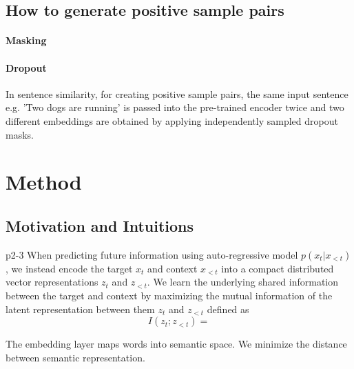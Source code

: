 \documentclass[a4paper]{article}
\begin{document}
	

	\subsection{How to generate positive sample pairs}
	\paragraph*{Masking}
	\paragraph*{Dropout} \cite{gao2021simcse} In sentence similarity, for creating positive sample pairs, the same input sentence e.g. 'Two dogs are running' is passed into the pre-trained encoder twice and two different embeddings are obtained by applying independently sampled dropout masks.  

	\section{Method}

	\subsection{Motivation and Intuitions}

	\cite{van2018representation}p2-3
	When predicting future information using auto-regressive model $p(x_t|x_{<t})$, we instead encode the target $x_t$ and context $x_{<t}$ into a compact distributed vector representations $z_t$ and $z_{<t}$.
	We learn the underlying shared information between the target and context by maximizing the mutual information of the latent representation between them $z_t$ and $z_{<t}$ defined as
	\begin{equation}
		I(z_t; z_{<t}) = 
	\end{equation}

	The embedding layer maps words into semantic space. We minimize the distance between semantic representation.


	
		
\end{document}
